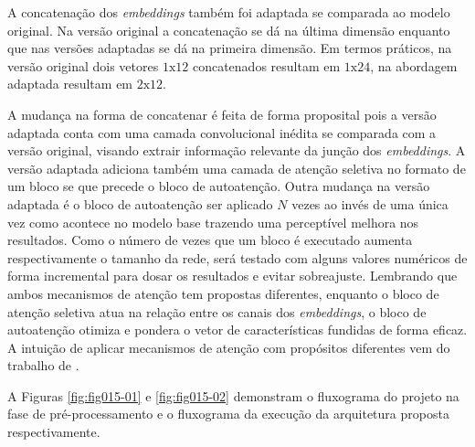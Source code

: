 A concatenação dos \textit{embeddings} também foi adaptada se comparada ao modelo original. Na versão original a concatenação se dá na última dimensão enquanto que nas versões adaptadas se dá na primeira dimensão. Em termos práticos, na versão original dois vetores $1\text{x}12$ concatenados resultam em $1\text{x}24$, na abordagem adaptada resultam em $2\text{x}12$. 

A mudança na forma de concatenar é feita de forma proposital pois a versão adaptada conta com uma camada convolucional inédita se comparada com a versão original, visando extrair informação relevante da junção dos \textit{embeddings}. A versão adaptada adiciona também uma camada de atenção seletiva no formato de um bloco \gls{se} que precede o bloco de autoatenção. Outra mudança na versão adaptada é o bloco de autoatenção ser aplicado $N$ vezes ao invés de uma única vez como acontece no modelo base trazendo uma perceptível melhora nos resultados. Como o número de vezes que um bloco é executado aumenta respectivamente o tamanho da rede, será testado com alguns valores numéricos de forma incremental para dosar os resultados e evitar sobreajuste. Lembrando que ambos mecanismos de atenção tem propostas diferentes, enquanto o bloco de atenção seletiva atua na relação entre os canais dos \textit{embeddings}, o bloco de autoatenção otimiza e pondera o vetor de características fundidas de forma eficaz. A intuição de aplicar mecanismos de atenção com propósitos diferentes vem do trabalho de \cite{yangNeuralNetworkDesign2024a}. 

A Figuras \ref{fig:fig015-01} e \ref{fig:fig015-02} demonstram o fluxograma do projeto na fase de pré-processamento e o fluxograma da execução da arquitetura proposta respectivamente.

